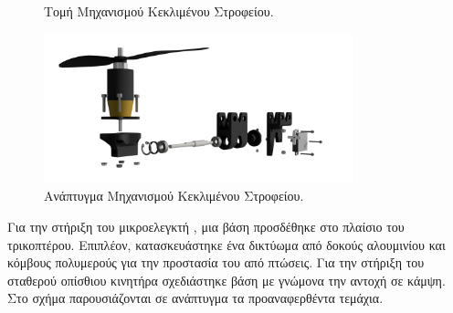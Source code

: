 \begin{figure}[H]
    \centering
    \caption{Τομή Μηχανισμού Κεκλιμένου Στροφείου.}\label{fig:sk_section_view}
\end{figure}

\begin{figure}[H]
    \centering
    \includegraphics[width=0.8\textwidth]{Skoupa/Expl_Mechanism_edit.png}
    \caption{Ανάπτυγμα Μηχανισμού Κεκλιμένου Στροφείου.}\label{fig:sk_mech_ass}
\end{figure}

Για την στήριξη του μικροελεγκτή , μια βάση προσδέθηκε στο πλαίσιο 
του τρικοπτέρου. Επιπλέον, κατασκευάστηκε ένα δικτύωμα από δοκούς αλουμινίου και 
κόμβους πολυμερούς  για την προστασία του από πτώσεις. Για την στήριξη 
του σταθερού οπίσθιου κινητήρα σχεδιάστηκε βάση με γνώμονα την αντοχή σε κάμψη.
Στο σχήμα παρουσιάζονται σε ανάπτυγμα τα προαναφερθέντα τεμάχια.

